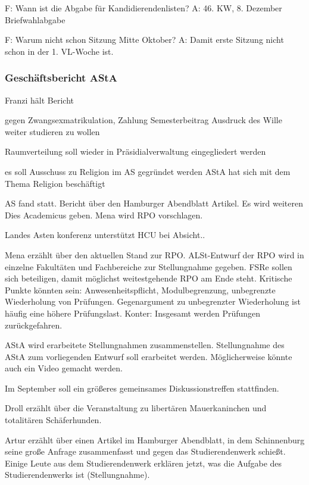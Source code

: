 \documentclass[ngerman,headheight=70pt]{scrartcl}
\begin{document}
    F: Wann ist die Abgabe für Kandidierendenlisten?
    A: 46. KW, 8. Dezember Briefwahlabgabe

    F: Warum nicht schon Sitzung Mitte Oktober?
    A: Damit erste Sitzung nicht schon in der 1. VL-Woche ist.

    \subsubsection{Geschäftsbericht AStA}

    Franzi hält Bericht

    gegen Zwangsexmatrikulation, Zahlung Semesterbeitrag Ausdruck des Wille
    weiter studieren zu wollen

    Raumverteilung soll wieder in Präsidialverwaltung eingegliedert werden

    es soll Ausschuss zu Religion im AS gegründet werden
    AStA hat sich mit dem Thema Religion beschäftigt

    AS fand statt. Bericht über den Hamburger Abendblatt Artikel.
    Es wird weiteren Dies Academicus geben. Mena wird RPO vorschlagen.

    Landes Asten konferenz unterstützt HCU bei Absicht..

    Mena erzählt über den aktuellen Stand zur RPO. ALSt-Entwurf der RPO
    wird in einzelne Fakultäten und Fachbereiche zur Stellungnahme gegeben.
    FSRe sollen sich beteiligen, damit möglichst weitestgehende RPO
    am Ende steht. Kritische Punkte könnten sein: Anwesenheitspflicht,
    Modulbegrenzung, unbegrenzte Wiederholung von Prüfungen.
    Gegenargument zu unbegrenzter Wiederholung ist häufig eine höhere
    Prüfungslast. Konter: Insgesamt werden Prüfungen zurückgefahren.

    AStA wird erarbeitete Stellungnahmen zusammenstellen. Stellungnahme
    des AStA zum vorliegenden Entwurf soll erarbeitet werden. Möglicherweise
    könnte auch ein Video gemacht werden.

    Im September soll ein größeres gemeinsames Diskussionstreffen stattfinden.

    Droll erzählt über die Veranstaltung zu libertären Mauerkaninchen und
    totalitären Schäferhunden.

    Artur erzählt über einen Artikel im Hamburger Abendblatt, in dem
    Schinnenburg seine große Anfrage zusammenfasst und gegen das Studierendenwerk
    schießt. Einige Leute aus dem Studierendenwerk erklären jetzt, was
    die Aufgabe des Studierendenwerks ist (Stellungnahme).
\end{document}
